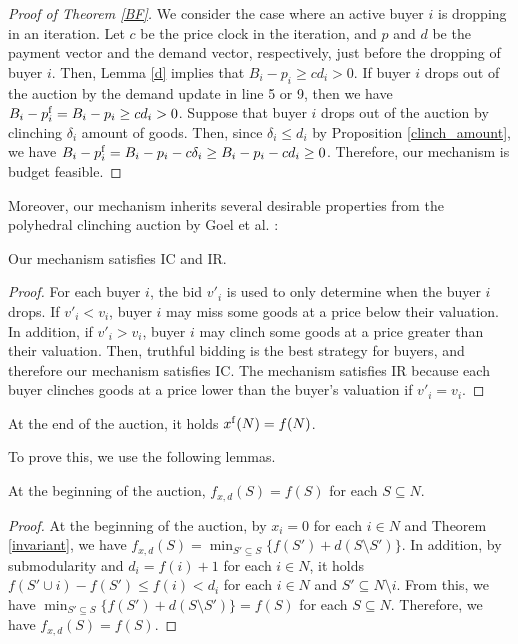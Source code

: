 \documentclass[letterpaper,11pt]{article}
\begin{document}
	\begin{proof}[Proof of Theorem \ref{BF}]
	We consider the case where an active buyer $i$ is dropping in an iteration.
	Let $c$ be the price clock in the iteration, and  
	$p$ and $d$ be the payment vector and the demand vector, respectively, 
	just before the dropping of buyer $i$.
	Then, Lemma \ref{d} implies that $B_i-p_i\geq c d_i>0$. 
	If buyer $i$ drops out of the auction by the demand update in line 5 or 9, 
	then we have $B_i-p^{\rm f}_i=B_i-p_i\geq c d_i>0$.
	Suppose that buyer $i$ drops out of the auction by clinching $\delta_i$ amount of goods. 
	Then, since $\delta_i\leq d_i$ by Proposition \ref{clinch_amount}, 
	we have $B_i-p^{\rm f}_i=B_i-p_i-c\delta_i\geq B_i-p_i-c d_i\geq 0$.
	Therefore, our mechanism is budget feasible. 
	\end{proof}


Moreover, our mechanism inherits several desirable properties from 
the polyhedral clinching auction by Goel et al. \cite{GMP2015}: 
\begin{theorem}
	\label{IC_IR}
	Our mechanism satisfies IC and IR.
\end{theorem}	
\begin{proof}
	For each buyer $i$, the bid $v'_i$ is used to only determine when the buyer $i$ 
	drops. If $v'_i<v_i$, buyer $i$ may miss some goods at a price below their valuation.
	In addition, if $v'_i>v_i$, buyer $i$ may clinch some goods at a price greater than their valuation. Then, truthful bidding is 
	the best strategy for buyers, and therefore our mechanism satisfies IC. 
	The mechanism satisfies IR because each buyer clinches goods at a price lower than the buyer's valuation if $v'_i=v_i$. 
\end{proof}
\begin{proposition}
\label{all_goods}
At the end of the auction, it holds $x^{\rm f}(N)=f(N)$.
\end{proposition}
	To prove this, we use the following lemmas. 
	

	\begin{lemma}
	\label{beginning}
	At the beginning of the auction, $f_{x,d}(S)=f(S)$ for each $S\subseteq N$.
	\end{lemma}
	\begin{proof}
	At the beginning of the auction, by $x_i=0$ for each $i\in N$ and Theorem \ref{invariant},
	we have $f_{x,d}(S)=\min_{S'\subseteq S}\{f(S')+d(S\setminus S')\}.$
	In addition, by submodularity and $d_i=f(i)+1$ for each $i\in N$, it holds $f(S'\cup i)-f(S')\leq f(i)<d_i$ for each $i\in N$ and $S'\subseteq N\setminus i$. 
	From this, we have $\min_{S'\subseteq S}\{f(S')+d(S\setminus S')\}=f(S)$ for each $S\subseteq N$. 
	Therefore, we have $f_{x,d}(S)=f(S)$. 
	\end{proof}
\end{document}
